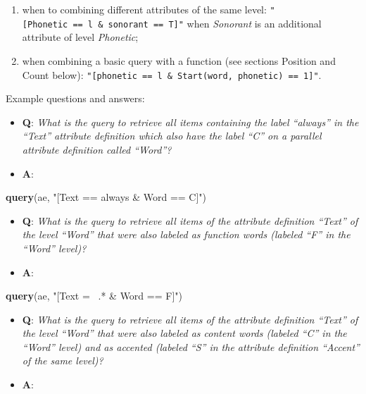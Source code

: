 \documentclass[]{book}
\newenvironment{Shaded}{\begin{snugshade}}{\end{snugshade}}
\newcommand{\KeywordTok}[1]{\textcolor[rgb]{0.13,0.29,0.53}{\textbf{#1}}}
\newcommand{\NormalTok}[1]{#1}
\newcommand{\StringTok}[1]{\textcolor[rgb]{0.31,0.60,0.02}{#1}}
\providecommand{\tightlist}{%
  \setlength{\itemsep}{0pt}\setlength{\parskip}{0pt}}
\theoremstyle{definition}
\theoremstyle{definition}
\theoremstyle{definition}
\theoremstyle{remark}
\begin{document}
\begin{enumerate}
\def\labelenumi{\arabic{enumi}.}
\tightlist
\item
  when to combining different attributes of the same level:
  \texttt{"{[}Phonetic\ ==\ l\ \&\ sonorant\ ==\ T{]}"} when
  \emph{Sonorant} is an additional attribute of level \emph{Phonetic};
\item
  when combining a basic query with a function (see sections Position
  and Count below):
  \texttt{"{[}phonetic\ ==\ l\ \&\ Start(word,\ phonetic)\ ==\ 1{]}"}.
\end{enumerate}

Example questions and answers:

\begin{itemize}
\tightlist
\item
  \textbf{Q}: \emph{What is the query to retrieve all items containing
  the label ``always'' in the ``Text'' attribute definition which also
  have the label ``C'' on a parallel attribute definition called
  ``Word''?}
\item
  \textbf{A}:
\end{itemize}

\begin{Shaded}
\begin{Highlighting}[]
\KeywordTok{query}\NormalTok{(ae, }\StringTok{"[Text == always & Word == C]"}\NormalTok{)}
\end{Highlighting}
\end{Shaded}

\begin{itemize}
\tightlist
\item
  \textbf{Q}: \emph{What is the query to retrieve all items of the
  attribute definition ``Text'' of the level ``Word'' that were also
  labeled as function words (labeled ``F'' in the ``Word'' level)?}
\item
  \textbf{A}:
\end{itemize}

\begin{Shaded}
\begin{Highlighting}[]
\KeywordTok{query}\NormalTok{(ae, }\StringTok{"[Text =~ .* & Word == F]"}\NormalTok{)}
\end{Highlighting}
\end{Shaded}

\begin{itemize}
\tightlist
\item
  \textbf{Q}: \emph{What is the query to retrieve all items of the
  attribute definition ``Text'' of the level ``Word'' that were also
  labeled as content words (labeled ``C'' in the ``Word'' level) and as
  accented (labeled ``S'' in the attribute definition ``Accent'' of the
  same level)?}
\item
  \textbf{A}:
\end{itemize}
\end{document}
